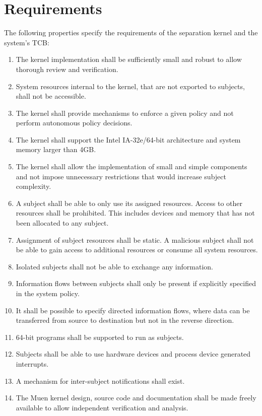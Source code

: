\section{Requirements}\label{sec:requirements}

The following properties specify the requirements of the separation kernel and
the system's TCB:
\begin{enumerate}
	\item The kernel implementation shall be sufficiently small and robust to
		allow thorough review and verification.
	\item System resources internal to the kernel, that are not exported to
		subjects, shall not be accessible.
	\item The kernel shall provide mechanisms to enforce a given policy and not
		perform autonomous policy decisions.
	\item The kernel shall support the Intel IA-32e/64-bit architecture and
		system memory larger than 4GB.
	\item The kernel shall allow the implementation of small and simple
		components and not impose unnecessary restrictions that would increase
		subject complexity.
	\item A subject shall be able to only use its assigned resources. Access to
		other resources shall be prohibited. This includes devices and memory
		that has not been allocated to any subject.
	\item Assignment of subject resources shall be static. A malicious subject
		shall not be able to gain access to additional resources or consume all
		system resources.
	\item Isolated subjects shall not be able to exchange any information.
	\item Information flows between subjects shall only be present if explicitly
		specified in the system policy.
	\item It shall be possible to specify directed information flows, where data
		can be transferred from source to destination but not in the reverse
		direction.
	\item 64-bit programs shall be supported to run as subjects.
	\item Subjects shall be able to use hardware devices and process device
		generated interrupts.
	\item A mechanism for inter-subject notifications shall exist.
	\item The Muen kernel design, source code and documentation shall be made
		freely available to allow independent verification and analysis.
\end{enumerate}
